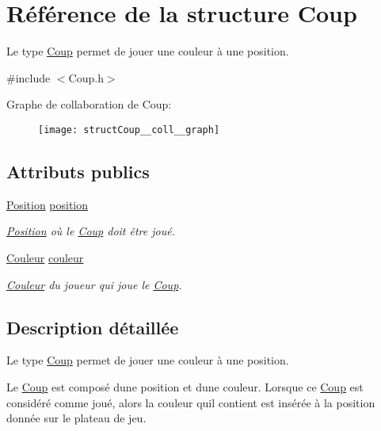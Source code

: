 \hypertarget{structCoup}{}\section{Référence de la structure Coup}
\label{structCoup}


Le type \hyperlink{structCoup}{Coup} permet de jouer une couleur à une position.  




{\ttfamily \#include $<$Coup.\+h$>$}



Graphe de collaboration de Coup\+:
\nopagebreak
\begin{figure}[H]
\begin{center}
\leavevmode
\texttt{[image: structCoup\_\_coll\_\_graph]}
\end{center}
\end{figure}
\subsection*{Attributs publics}
\begin{DoxyCompactItemize}
\item 
\hyperlink{structPosition}{Position} \hyperlink{structCoup_a53a5b29ee8fde3fa1c9fbc220e2f5a56}{position}
\begin{DoxyCompactList}\small\item\em \hyperlink{structPosition}{Position} où le \hyperlink{structCoup}{Coup} doit être joué. \end{DoxyCompactList}\item 
\hyperlink{structCouleur}{Couleur} \hyperlink{structCoup_a6abc44ab931a3ff7d12b475f5af460f3}{couleur}
\begin{DoxyCompactList}\small\item\em \hyperlink{structCouleur}{Couleur} du joueur qui joue le \hyperlink{structCoup}{Coup}. \end{DoxyCompactList}\end{DoxyCompactItemize}


\subsection{Description détaillée}
Le type \hyperlink{structCoup}{Coup} permet de jouer une couleur à une position. 

Le \hyperlink{structCoup}{Coup} est composé d\textquotesingle{}une position et d\textquotesingle{}une couleur. Lorsque ce \hyperlink{structCoup}{Coup} est considéré comme joué, alors la couleur qu\textquotesingle{}il contient est insérée à la position donnée sur le plateau de jeu. 

